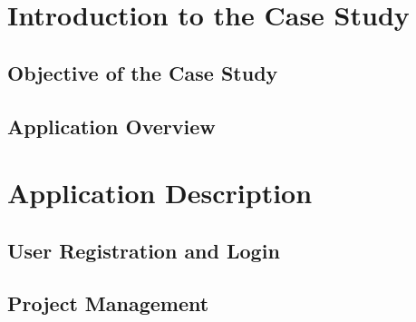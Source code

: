 




\section{Introduction to the Case Study}
\subsection{Objective of the Case Study}
\subsection{Application Overview}

\section{Application Description}
\subsection{User Registration and Login}
\subsection{Project Management}

